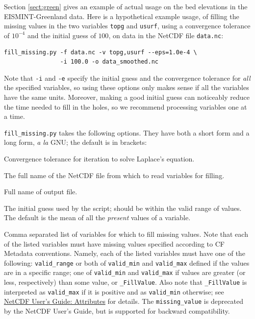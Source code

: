\documentclass[11pt,final]{amsart}
\newcommand{\und}{\_\!\_}
\begin{document}
Section \ref{sect:green} gives an example of actual usage on the bed elevations in the EISMINT-Greenland data.  Here is a hypothetical example usage, of filling the missing values in the two variables \verb|topg| and \verb|usurf|, using a convergence tolerance of $10^{-4}$ and the initial guess of $100$, on data in the NetCDF file \verb|data.nc|:

\begin{verbatim}
fill_missing.py -f data.nc -v topg,usurf --eps=1.0e-4 \
                -i 100.0 -o data_smoothed.nc
\end{verbatim}
Note that \verb|-i| and \verb|-e| specify the initial guess and the convergence tolerance for \emph{all} the specified variables, so using these options only makes sense if all the variables have the same units. Moreover, making a good initial guess can noticeably reduce the time needed to fill in the holes, so we recommend processing variables one at a time.

\opthead  \verb|fill_missing.py| takes the following options.  They have both a short form and a long form, \emph{a la} GNU; the default is in brackets:

  Convergence tolerance for iteration to solve Laplace's equation.

  The full name of the NetCDF file from which to read variables for filling.

\scriptoptdef{o}{out\und file}{no default}  Full name of output file.

\scriptoptdef{i}{initial\und guess}{'mean'}  The initial guess used by the script; should be within the valid range of values. The default is the mean of all the \emph{present} values of a variable.

  Comma separated list of variables for which to fill missing values.  Note that each of the listed variables must have missing values specified according to CF Metadata conventions. Namely, each of the listed variables must have one of the following: \verb|valid_range| or both of \verb|valid_min| and \verb|valid_max| defined if the values are in a specific range; one of \verb|valid_min| and \verb|valid_max| if values are greater (or less, respectively) than some value, or \verb|_FillValue|. Also note that \verb|_FillValue| is interpreted as \verb|valid_max| if it is positive and as \verb|valid_min| otherwise; see \href{http://www.unidata.ucar.edu/software/netcdf/guide_10.html#SEC76}{NetCDF User's Guide: Attributes} for details. The \verb|missing_value| is deprecated by the NetCDF User's Guide, but is supported for backward compatibility.
\end{document}

